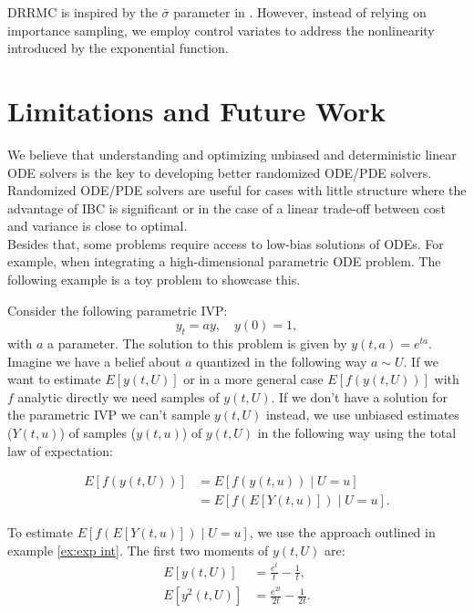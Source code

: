 \documentclass[a4paper,12pt]{article}
\begin{document}
\begin{example}[DRRMC]
\end{example}

\begin{related}[DRRMC]
    DRRMC is inspired by the $\bar{\sigma}$ parameter in \cite{sawhney_grid-free_2022}.
    However, instead of relying on importance sampling, we employ control
    variates to address the nonlinearity introduced by the exponential
    function.
\end{related}

\section{Limitations and Future Work}

We believe that understanding and optimizing unbiased and deterministic linear ODE solvers
is the key to developing better randomized ODE/PDE solvers.
Randomized ODE/PDE solvers are useful for cases with little structure
where the advantage of IBC is significant or in the case of a linear trade-off
between cost and variance is close to optimal. \\


Besides that, some problems require access to low-bias solutions of
ODEs. For example, when integrating a high-dimensional parametric ODE problem.
The following example is a toy problem to showcase this.

\begin{example} \label{ex:random ode}
    Consider the following parametric IVP:
    \begin{equation}\label{eq:random ode}
        y_t = ay, \quad y(0)=1,
    \end{equation}
    with $a$ a parameter. The solution to this problem is given by
    $y(t,a) = e^{ta}$. Imagine we have a belief about $a$ quantized
    in the following way $a\sim U$. If we want
    to estimate $E[y(t, U)]$ or in a more general case
    $E[f(y(t, U))]$ with $f$ analytic directly
    we need samples of $y(t,U)$. If we don't have a solution for the parametric IVP
    we can't sample $y(t,U)$ instead, we use unbiased estimates ($Y(t,u)$) of samples ($y(t,u)$)
    of $y(t, U)$ in the following
    way using the total law of expectation:

    \begin{align}
        E[f(y(t,U))] & = E[f(y(t,u)) \mid U=u]     \\
                     & = E[f(E[Y(t,u)]) \mid U=u].
    \end{align}

    To estimate $E[f(E[Y(t,u)]) \mid U =u]$, we use the approach outlined in
    example \ref{ex:exp int}. The first two moments of $y(t, U)$ are:
    \begin{align}
        E[y(t,U)]      & = \frac{e^t}{t} - \frac{1}{t},      \\
        E[y^{2}(t, U)] & = \frac{e^{2t}}{2t} - \frac{1}{2t}.
    \end{align}
\end{example}
\end{document}
